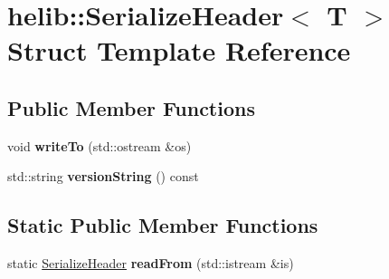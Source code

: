 \hypertarget{structhelib_1_1SerializeHeader}{}\section{helib\+:\+:Serialize\+Header$<$ T $>$ Struct Template Reference}
\label{structhelib_1_1SerializeHeader}
\subsection*{Public Member Functions}
\begin{DoxyCompactItemize}
\item 
\mbox{\label{structhelib_1_1SerializeHeader_aef7bc4c7a195bfeb27faea71019ee2c6}} 
void {\bfseries write\+To} (std\+::ostream \&os)
\item 
\mbox{\label{structhelib_1_1SerializeHeader_a0b4ae124ba86a41140d40d7bf7d18a73}} 
std\+::string {\bfseries version\+String} () const
\end{DoxyCompactItemize}
\subsection*{Static Public Member Functions}
\begin{DoxyCompactItemize}
\item 
\mbox{\label{structhelib_1_1SerializeHeader_a12278c59f0e9bfc29b9a9d4b8f559ab6}} 
static \hyperlink{structhelib_1_1SerializeHeader}{Serialize\+Header} {\bfseries read\+From} (std\+::istream \&is)
\end{DoxyCompactItemize}

